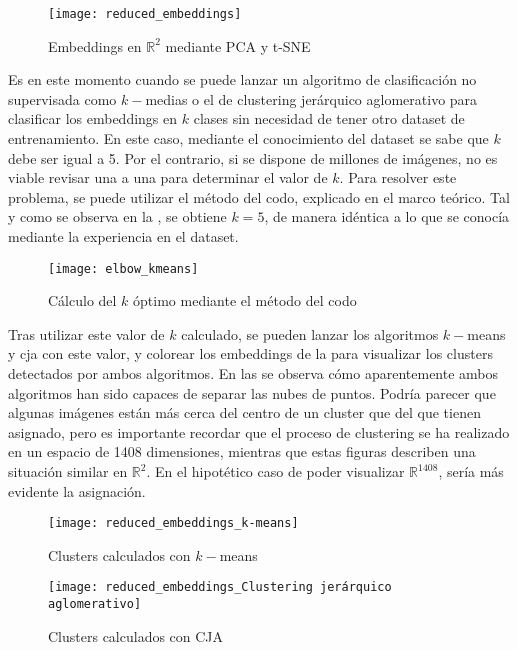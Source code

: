 				\begin{figure}[!h]
					\centering
					\texttt{[image: reduced\_embeddings]}
					\caption{Embeddings en $\mathbb{R}^2$ mediante PCA y t-SNE}
					\label{fig:embeddingsR2}
				\end{figure}
				
				Es en este momento cuando se puede lanzar un algoritmo de clasificación no supervisada como $k-$medias o el de clustering jerárquico aglomerativo para clasificar los embeddings en $k$ clases sin necesidad de tener otro dataset de entrenamiento. En este caso, mediante el conocimiento del dataset se sabe que $k$ debe ser igual a 5. Por el contrario, si se dispone de millones de imágenes, no es viable revisar una a una para determinar el valor de $k$. Para resolver este problema, se puede utilizar el método del codo, explicado en el marco teórico. Tal y como se observa en la , se obtiene $k = 5$, de manera idéntica a lo que se conocía mediante la experiencia en el dataset. \\
				
				\begin{figure}[!h]
					\centering
					\texttt{[image: elbow\_kmeans]}
					\caption{Cálculo del $k$ óptimo mediante el método del codo}
					\label{fig:elbow}
				\end{figure} 
				
				Tras utilizar este valor de $k$ calculado, se pueden lanzar los algoritmos $k-$means y \gls{cja} con este valor, y colorear los embeddings de la  para visualizar los clusters detectados por ambos algoritmos. En las  se observa cómo aparentemente ambos algoritmos han sido capaces de separar las nubes de puntos. Podría parecer que algunas imágenes están más cerca del centro de un cluster que del que tienen asignado, pero es importante recordar que el proceso de clustering se ha realizado en un espacio de 1408 dimensiones, mientras que estas figuras describen una situación similar en $\mathbb{R}^2$. En el hipotético caso de poder visualizar $\mathbb{R}^{1408}$, sería más evidente la asignación. 
				
				\begin{figure}[!h]
					\centering
					\texttt{[image: reduced\_embeddings\_k-means]}
					\caption{Clusters calculados con $k-$means}
					\label{fig:clusters_kmeans}
				\end{figure} 
				
				\begin{figure}[!h]
					\centering
					\texttt{[image: reduced\_embeddings\_Clustering jerárquico aglomerativo]}
					\caption{Clusters calculados con CJA}
					\label{fig:clusters_cja}
				\end{figure} 
				
